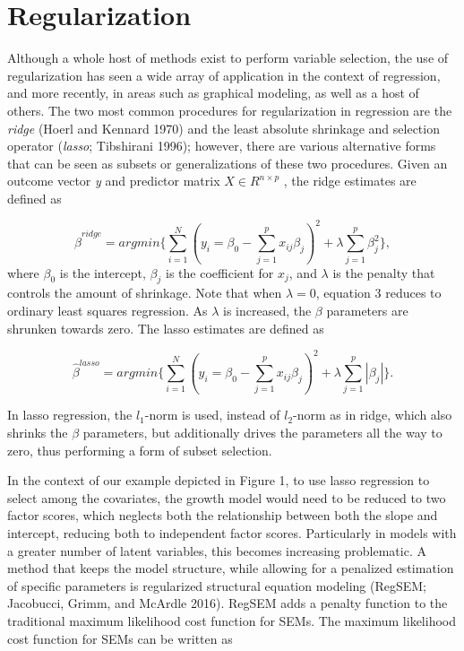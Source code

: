 \documentclass[article]{jss}
\begin{document}
\section{Regularization}\label{regularization}

Although a whole host of methods exist to perform variable selection,
the use of regularization has seen a wide array of application in the
context of regression, and more recently, in areas such as graphical
modeling, as well as a host of others. The two most common procedures
for regularization in regression are the \textit{ridge} (Hoerl and
Kennard 1970) and the least absolute shrinkage and selection operator
(\textit{lasso}; Tibshirani 1996); however, there are various
alternative forms that can be seen as subsets or generalizations of
these two procedures. Given an outcome vector \textit{y} and predictor
matrix \(X \in {R}^{n \times p}\) , the ridge estimates are defined as

\[\tag{1}
\hat{\beta}^{ridge}= argmin \Big\{ \sum_{i=1}^{N} (y_{i} = \beta_{0} - \sum_{j=1}^{p}x_{ij} \beta_{j})^{2}  + \lambda \sum_{j=1}^{p} \beta_{j}^{2}\Big\},
\] \noindent
where \(\beta_{0}\) is the intercept, \(\beta_{j}\) is the coefficient
for \(x_{j}\), and \(\lambda\) is the penalty that controls the amount
of shrinkage. Note that when \(\lambda = 0\), equation 3 reduces to
ordinary least squares regression. As \(\lambda\) is increased, the
\(\beta\) parameters are shrunken towards zero. The lasso estimates are
defined as

\[\tag{2}
\hat{\beta}^{lasso}= argmin \Big\{ \sum_{i=1}^{N} (y_{i} = \beta_{0} - \sum_{j=1}^{p}x_{ij} \beta_{j})^{2}  + \lambda \sum_{j=1}^{p}|\beta_{j}|\Big\}.
\]

\noindent
In lasso regression, the \(l_{1}\)-norm is used, instead of
\(l_{2}\)-norm as in ridge, which also shrinks the \(\beta\) parameters,
but additionally drives the parameters all the way to zero, thus
performing a form of subset selection.

In the context of our example depicted in Figure 1, to use lasso
regression to select among the covariates, the growth model would need
to be reduced to two factor scores, which neglects both the relationship
between both the slope and intercept, reducing both to independent
factor scores. Particularly in models with a greater number of latent
variables, this becomes increasing problematic. A method that keeps the
model structure, while allowing for a penalized estimation of specific
parameters is regularized structural equation modeling (RegSEM;
Jacobucci, Grimm, and McArdle 2016). RegSEM adds a penalty function to
the traditional maximum likelihood cost function for SEMs. The maximum
likelihood cost function for SEMs can be written as
\end{document}
